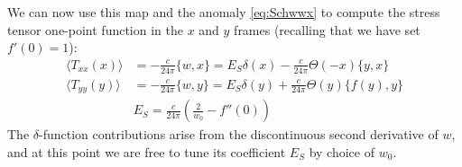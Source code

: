 \documentclass[12pt]{article}
\newcommand{\RR}{\mathbb{R}}
\newcommand{\CC}{\mathbb{C}}
\begin{document}
We can now use this map and the anomaly \eqref{eq:Schwwx} to compute the stress tensor one-point function in the $x$ and $y$ frames (recalling that we have set $f'(0)=1$):
\begin{align}
	\langle T_{xx}(x) \rangle &= -\frac{c}{24\pi} \{w,x\} = E_S \delta(x) -\frac{c}{24\pi} 	\Theta(-x) \{y,x\} \label{eq:Txx} \\
	\langle T_{yy}(y) \rangle &= -\frac{c}{24\pi} \{w,y\} = E_S \delta(y) +\frac{c}{24\pi} 	\Theta(y) \{f(y),y\}  \\
	&E_S =  \frac{c}{24\pi}\left(\frac{2}{w_0}-f''(0)\right)
\end{align}
The $\delta$-function contributions arise from the discontinuous second derivative of $w$, and at this point we are free to tune its coefficient $E_S$ by choice of $w_0$.






\end{document}
